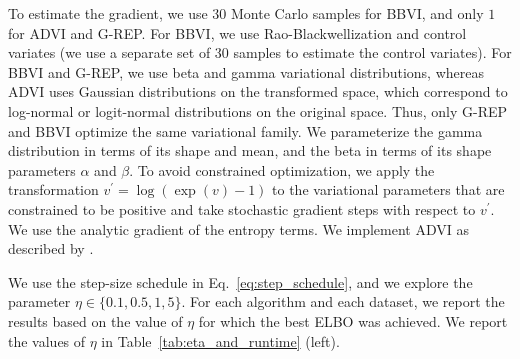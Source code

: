 \vspace*{-7pt}
To estimate the gradient, we use $30$ Monte Carlo samples for \gls{BBVI}, and only $1$ for \gls{ADVI} and \acrshort{G-REP}. For \gls{BBVI}, we use Rao-Blackwellization and control variates (we use a separate set of $30$ samples to estimate the control variates). For \gls{BBVI} and \acrshort{G-REP}, we use beta and gamma variational distributions, whereas \gls{ADVI} uses Gaussian distributions on the transformed space, which correspond to log-normal or logit-normal distributions on the original space. Thus, only \acrshort{G-REP} and \gls{BBVI} optimize the same variational family. We parameterize the gamma distribution in terms of its shape and mean, and the beta in terms of its shape parameters $\alpha$ and $\beta$. To avoid constrained optimization, we apply the transformation $v^\prime=\log(\exp(v)-1)$ to the variational parameters that are constrained to be positive and take stochastic gradient steps with respect to $v^\prime$. We use the analytic gradient of the entropy terms. We implement \gls{ADVI} as described by \citet{Kucukelbir2016}.

We use the step-size schedule in Eq.~\ref{eq:step_schedule}, and we explore the parameter $\eta\in\{0.1,0.5,1,5\}$. For each algorithm and each dataset, we report the results based on the value of $\eta$ for which the best \gls{ELBO} was achieved. We report the values of $\eta$ in Table~\ref{tab:eta_and_runtime} (left).



